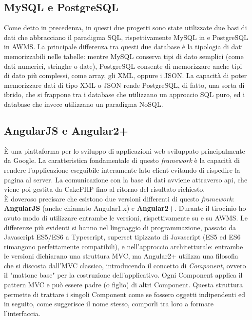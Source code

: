 \subsection{MySQL e PostgreSQL}
Come detto in precedenza, in questi due progetti sono state utilizzate due basi di dati che abbracciano il paradigma SQL, rispettivamente MySQL in \DS{} e PostgreSQL in AWMS.
La principale differenza tra questi due database è la tipologia di dati memorizzabili nelle tabelle: mentre MySQL conserva tipi di dato semplici (come dati numerici, stringhe o date), PostgreSQL consente di memorizzare anche tipi di dato più complessi, come array, gli XML, oppure i JSON.
La capacità di poter memorizzare dati di tipo XML o JSON rende PostgreSQL, di fatto, una sorta di  ibrido, che si frappone tra i database che utilizzano un approccio SQL puro, ed i database che invece utilizzano un paradigma NoSQL. 
\subsection{AngularJS e Angular2+}
\`E una piattaforma  per lo sviluppo di applicazioni web sviluppato principalmente da Google. La caratteristica fondamentale di questo \textit{\gls{framework}} è la capacità di rendere l’applicazione eseguibile interamente lato \gls{client} evitando di rispedire la pagina al server. La comunicazione con la base di dati avviene attraverso \acrshort{api}, che viene poi gestita da CakePHP fino al ritorno del risultato richiesto.\\
\`E doveroso precisare che esistono due versioni differenti di questo \textit{\gls{framework}}: \textbf{AngularJS} (anche chiamato Angular1.x) e \textbf{Angular2+}. Durante il tirocinio ho avuto modo di utilizzare entrambe le versioni, rispettivamente su \DS{} e su AWMS. 
Le differenze più evidenti si hanno nel linguaggio di programmazione, passato da Javascript ES5/ES6 a Typescript, superset tipizzato di Javascript (ES5 ed ES6 rimangono perfettamente compatibili), e nell'approccio architetturale: entrambe le versioni dichiarano una struttura MVC, ma Angular2+ utilizza una filosofia che si discosta dall'MVC classico, introducendo il concetto di \textit{Component}, ovvero il "mattone base" per la costruzione dell'applicativo.
Ogni Component applica il pattern MVC e può essere padre (o figlio) di altri Component. Questa struttura permette di trattare i singoli Component come se fossero oggetti indipendenti ed in seguito, come suggerisce il nome stesso, comporli tra loro a formare l'interfaccia.
